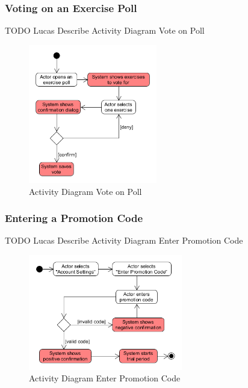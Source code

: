 \subsubsection{Voting on an Exercise Poll}
\label{sssec:voting_on_exercise_poll}

TODO Lucas Describe Activity Diagram Vote on Poll

\begin{figure}[H]
    \begin{center}
        \includegraphics[width=0.5\textwidth]{images/diagrams/activity_diagrams/ActivityDiagram_VoteOnExercisePoll.png}
        \caption{Activity Diagram Vote on Poll}
        \label{fig:activity_diagram_vote_on_poll}
    \end{center}
\end{figure}

\subsubsection{Entering a Promotion Code}
\label{sssec:entering_promotion_code}

TODO Lucas Describe Activity Diagram Enter Promotion Code

\begin{figure}[H]
    \begin{center}
        \includegraphics[width=0.6\textwidth]{images/diagrams/activity_diagrams/ActivityDiagram_EnterPromotionCode.png}
        \caption{Activity Diagram Enter Promotion Code}
        \label{fig:activity_diagram_enter_promotion_code}
    \end{center}
\end{figure}

